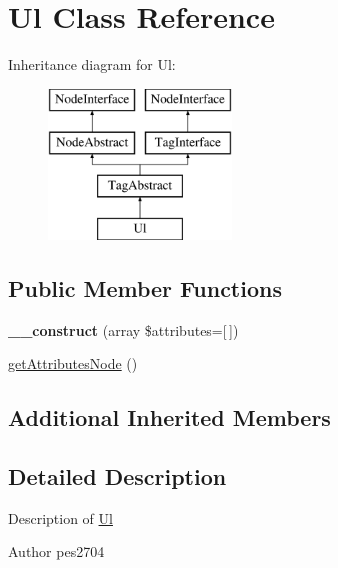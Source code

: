 \hypertarget{class_pes_1_1_dom_1_1_node_1_1_tag_1_1_ul}{}\section{Ul Class Reference}
\label{class_pes_1_1_dom_1_1_node_1_1_tag_1_1_ul}
Inheritance diagram for Ul\+:\begin{figure}[H]
\begin{center}
\leavevmode
\includegraphics[height=4.000000cm]{class_pes_1_1_dom_1_1_node_1_1_tag_1_1_ul}
\end{center}
\end{figure}
\subsection*{Public Member Functions}
\begin{DoxyCompactItemize}
\item 
\mbox{\label{class_pes_1_1_dom_1_1_node_1_1_tag_1_1_ul_afe55bc1439758d475e70446a774807d9}} 
{\bfseries \+\_\+\+\_\+construct} (array \$attributes=\mbox{[}$\,$\mbox{]})
\item 
\mbox{\hyperlink{class_pes_1_1_dom_1_1_node_1_1_tag_1_1_ul_a4722e7722b245351681b05d35f6694f3}{get\+Attributes\+Node}} ()
\end{DoxyCompactItemize}
\subsection*{Additional Inherited Members}


\subsection{Detailed Description}
Description of \mbox{\hyperlink{class_pes_1_1_dom_1_1_node_1_1_tag_1_1_ul}{Ul}}

\begin{DoxyAuthor}{Author}
pes2704 
\end{DoxyAuthor}


